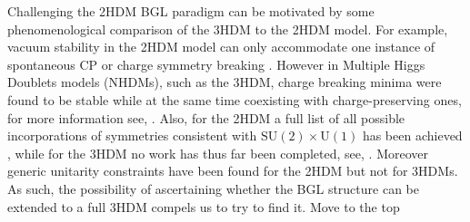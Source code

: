 %
%
%
Challenging the 2HDM BGL paradigm can be motivated by some phenomenological comparison of the 3HDM to the 2HDM model.
%
For example, vacuum stability in the 2HDM model can only accommodate one instance of spontaneous CP or charge symmetry breaking \cite{Branco_2012,Ferreira_2004,Barroso_2007}. 
%
However in Multiple Higgs Doublets models (NHDMs), such as the 3HDM, charge breaking minima were found to be stable while at the same time coexisting with charge-preserving ones, for more information see, \cite{Barroso_2006}.   
%
Also, for the 2HDM a full list of all possible incorporations of symmetries consistent with $\mathrm{SU(2)}\times\mathrm{U(1)}$ has been achieved \cite{Ivanov_2008,Ivanov2007}, while for the 3HDM no work has thus far been completed, see, \cite{Ivanov_2012,Ivanov_2015}. 
%
Moreover generic unitarity constraints have been found for the 2HDM \cite{Ginzburg_2005} but not for 3HDMs. 
%
As such, the possibility of ascertaining whether the BGL structure can be extended to a full 3HDM compels us to try to find it. { \color{blue} Move to the top }  


